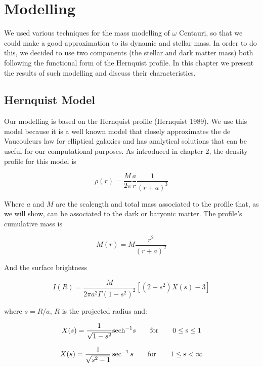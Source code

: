 \chapter{Modelling}

We used various techniques for the mass modelling of $\omega$ Centauri, so that we could make a good approximation to its dynamic and stellar mass. In order to do this, we decided to use two components (the stellar and dark matter mass) both following the functional form of the Hernquist profile. In this chapter we present the results of such modelling and discuss their characteristics.    

\section{Hernquist Model}

Our modelling is based on the Hernquist profile (Hernquist 1989).  We use this model because it is a well known model that closely approximates the de Vaucouleurs law for elliptical galaxies and has analytical solutions that can be useful for our computational purposes. As introduced in chapter 2, the density profile for this model is

\begin{equation}
\rho(r)=\frac{M}{2\pi}\frac{a}{r}\frac{1}{\left(r+a\right)^{3}}
\end{equation}

Where $a$ and $M$ are the scalength and total mass associated to the profile that, as we will show, can be associated to the dark or baryonic matter. The profile's cumulative mass is

\begin{equation}
M(r)=M\frac{r^{2}}{(r+a)^{2}}
\end{equation}
 
And the surface brightness 
 
 \begin{equation}
 I(R)=\frac{M}{2\pi a^{2}\Gamma\left(1-s^{2}\right)^{2}}\left[\left(2+s^{2}\right)X(s)-3\right]
 \end{equation}
 
where $s=R/a$, $R$ is the projected radius and:

\begin{equation}
X(s)=\frac{1}{\sqrt{1-s^{2}}}\text{sech}^{-1}s \qquad \rm{for} \qquad 0\leq s\leq1
\end{equation}

\begin{equation}
X(s)=\frac{1}{\sqrt{s^{2}-1}}\sec^{-1}s\qquad \rm{for} \qquad1\leq s<\infty
\end{equation}

